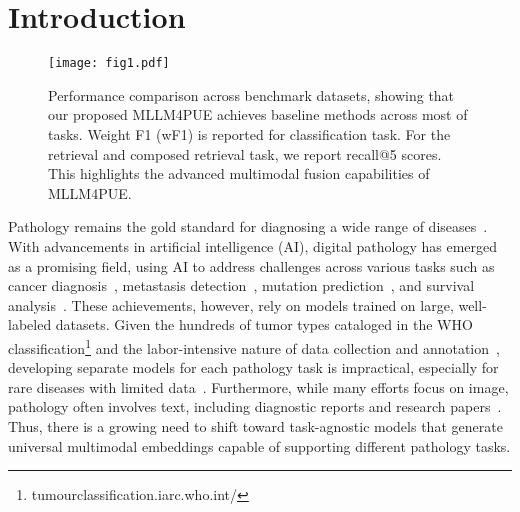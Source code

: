 \section{Introduction}
\label{sec:intro}
\begin{figure}
  \centering
    \texttt{[image: fig1.pdf]}
  \caption{Performance comparison across benchmark datasets, showing that our proposed MLLM4PUE achieves baseline methods across most of tasks. Weight F1 (wF1) is reported for classification task. For the retrieval and composed retrieval task, we report recall@5 scores. This highlights the advanced multimodal fusion capabilities of MLLM4PUE.}
  \label{fig1}
  \vspace{-2ex}
\end{figure}

Pathology remains the gold standard for diagnosing a wide range of diseases~\cite{xu2024multimodal,ma2024towards}. With advancements in artificial intelligence (AI), digital pathology has emerged as a promising field, using AI to address challenges across various tasks such as cancer diagnosis~\cite{lu2021data,sun2024context}, metastasis detection~\cite{zhang2023multi,khaliliboroujeni2022end}, mutation prediction~\cite{coudray2018classification,qu2021genetic}, and survival analysis~\cite{xiong2024mome,wang2024dual,zhou2024cohort}. These achievements, however, rely on models trained on large, well-labeled datasets. Given the hundreds of tumor types cataloged in the WHO classification\footnote{tumourclassification.iarc.who.int/} and the labor-intensive nature of data collection and annotation~\cite{erickson2022overview}, developing separate models for each pathology task is impractical, especially for rare diseases with limited data~\cite{kundra2021oncotree,lu2023visual}. Furthermore, while many efforts focus on image, pathology often involves text, including diagnostic reports and research papers~\cite{Che_WsiCaption_MICCAI2024,chen2025wsi,lu2024visual,guo2024histgen}. Thus, there is a growing need to shift toward task-agnostic models that generate universal multimodal embeddings capable of supporting different pathology tasks.

